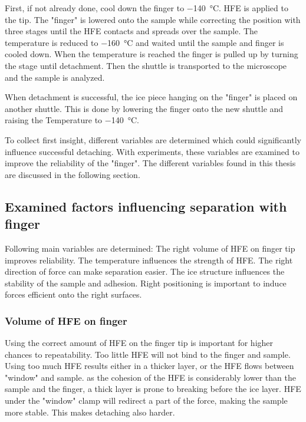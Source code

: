 First, if not already done, cool down the finger to \SI{-140}{\degreeCelsius}. HFE is applied to the tip. The "finger" is lowered onto the sample while correcting the position with three stages until the HFE contacts and spreads over the sample. The temperature is reduced to \SI{-160}{\degreeCelsius} and waited until the sample and finger is cooled down. When the temperature is reached the finger is pulled up by turning the stage until detachment. Then the shuttle is transported to the microscope and the sample is analyzed. 

When detachment is successful, the ice piece hanging on the "finger" is placed on another shuttle. This is done by lowering the finger onto the new shuttle and raising the Temperature to \SI{-140}{\degreeCelsius}.

To collect first insight, different variables are determined which could significantly influence successful detaching. With experiments, these variables are examined to improve the reliability of the "finger". The different variables found in this thesis are discussed in the following section.

\subsection{Examined factors influencing separation with finger}

Following main variables are determined: The right volume of HFE on finger tip improves reliability. The temperature influences the strength of HFE. The right direction of force can make separation easier. The ice structure influences the stability of the sample and adhesion. Right positioning is important to induce forces efficient onto the right surfaces.

\subsubsection{Volume of HFE on finger}

Using the correct amount of HFE on the finger tip is important for higher chances to repeatability. Too little HFE will not bind to the finger and sample. Using too much HFE results either in a thicker layer, or the HFE flows between "window" and sample. as the cohesion of the HFE is considerably lower than the sample and the finger, a thick layer is prone to breaking before the ice layer. HFE under the "window" clamp will redirect a part of the force, making the sample more stable. This makes detaching also harder.

